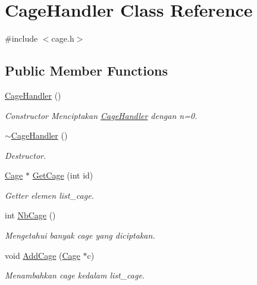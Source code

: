\hypertarget{classCageHandler}{}\section{Cage\+Handler Class Reference}
\label{classCageHandler}


{\ttfamily \#include $<$cage.\+h$>$}

\subsection*{Public Member Functions}
\begin{DoxyCompactItemize}
\item 
\hyperlink{classCageHandler_a7f611d145a35ec9037196beb280f0d15}{Cage\+Handler} ()\hypertarget{classCageHandler_a7f611d145a35ec9037196beb280f0d15}{}\label{classCageHandler_a7f611d145a35ec9037196beb280f0d15}

\begin{DoxyCompactList}\small\item\em Constructor Menciptakan \hyperlink{classCageHandler}{Cage\+Handler} dengan n=0. \end{DoxyCompactList}\item 
\hyperlink{classCageHandler_aeb3227fcc447d3dbb36636335f7f0235}{$\sim$\+Cage\+Handler} ()\hypertarget{classCageHandler_aeb3227fcc447d3dbb36636335f7f0235}{}\label{classCageHandler_aeb3227fcc447d3dbb36636335f7f0235}

\begin{DoxyCompactList}\small\item\em Destructor. \end{DoxyCompactList}\item 
\hyperlink{classCage}{Cage} $\ast$ \hyperlink{classCageHandler_a8564d2b8d6326c1f6771143b82951a64}{Get\+Cage} (int id)
\begin{DoxyCompactList}\small\item\em Getter elemen list\+\_\+cage. \end{DoxyCompactList}\item 
int \hyperlink{classCageHandler_aaf499991ae721d645daa9e655efc5b5d}{Nb\+Cage} ()
\begin{DoxyCompactList}\small\item\em Mengetahui banyak cage yang diciptakan. \end{DoxyCompactList}\item 
void \hyperlink{classCageHandler_a83693282e69e750f89a0973b042a4297}{Add\+Cage} (\hyperlink{classCage}{Cage} $\ast$c)
\begin{DoxyCompactList}\small\item\em Menambahkan cage kedalam list\+\_\+cage. \end{DoxyCompactList}\end{DoxyCompactItemize}


